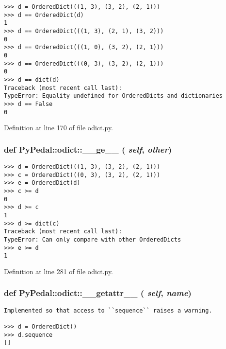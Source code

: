 \footnotesize\begin{verbatim}
>>> d = OrderedDict(((1, 3), (3, 2), (2, 1)))
>>> d == OrderedDict(d)
1
>>> d == OrderedDict(((1, 3), (2, 1), (3, 2)))
0
>>> d == OrderedDict(((1, 0), (3, 2), (2, 1)))
0
>>> d == OrderedDict(((0, 3), (3, 2), (2, 1)))
0
>>> d == dict(d)
Traceback (most recent call last):
TypeError: Equality undefined for OrderedDicts and dictionaries
>>> d == False
0
\end{verbatim}
\normalsize
 

Definition at line 170 of file odict.py.\hypertarget{namespacePyPedal_1_1odict_01a601bc99a7b43670f72ce56f8cfb52}{
\subsubsection{\setlength{\rightskip}{0pt plus 5cm}def PyPedal::odict::\_\-\_\-ge\_\-\_\- ( {\em self},  {\em other})}}
\label{namespacePyPedal_1_1odict_01a601bc99a7b43670f72ce56f8cfb52}




\footnotesize\begin{verbatim}
>>> d = OrderedDict(((1, 3), (3, 2), (2, 1)))
>>> c = OrderedDict(((0, 3), (3, 2), (2, 1)))
>>> e = OrderedDict(d)
>>> c >= d
0
>>> d >= c
1
>>> d >= dict(c)
Traceback (most recent call last):
TypeError: Can only compare with other OrderedDicts
>>> e >= d
1
\end{verbatim}
\normalsize
 

Definition at line 281 of file odict.py.\hypertarget{namespacePyPedal_1_1odict_f845d0373d3d7f018d050aa8afa76d2d}{
\subsubsection{\setlength{\rightskip}{0pt plus 5cm}def PyPedal::odict::\_\-\_\-getattr\_\-\_\- ( {\em self},  {\em name})}}
\label{namespacePyPedal_1_1odict_f845d0373d3d7f018d050aa8afa76d2d}




\footnotesize\begin{verbatim}
Implemented so that access to ``sequence`` raises a warning.

>>> d = OrderedDict()
>>> d.sequence
[]
\end{verbatim}
\normalsize
 

